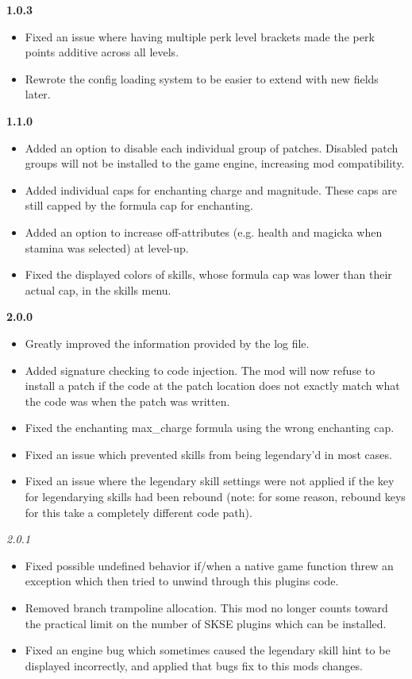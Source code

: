 \documentclass[12pt]{amsart}
\begin{document}
\startblock
\noindent
\textbf{1.0.3}
\begin{itemize}
    \item Fixed an issue where having multiple perk level brackets made the perk
          points additive across all levels.
    \item Rewrote the config loading system to be easier to extend with new
          fields later.
\end{itemize}
\stopblock

\startblock
\noindent
\textbf{1.1.0}
\begin{itemize}
    \item Added an option to disable each individual group of patches. Disabled
          patch groups will not be installed to the game engine, increasing mod
          compatibility.
    \item Added individual caps for enchanting charge and magnitude. These caps
          are still capped by the formula cap for enchanting.
    \item Added an option to increase off-attributes (e.g. health and magicka
          when stamina was selected) at level-up.
    \item Fixed the displayed colors of skills, whose formula cap was lower than
          their actual cap, in the skills menu.
\end{itemize}
\stopblock

\startblock
\noindent
\textbf{2.0.0}
\begin{itemize}
    \item Greatly improved the information provided by the log file.
    \item Added signature checking to code injection. The mod will now refuse to
          install a patch if the code at the patch location does not exactly
          match what the code was when the patch was written.
    \item Fixed the enchanting max\_charge formula using the wrong enchanting
          cap.
    \item Fixed an issue which prevented skills from being legendary'd in most
          cases.
    \item Fixed an issue where the legendary skill settings were not applied if
          the key for legendarying skills had been rebound (note: for some
          reason, rebound keys for this take a completely different code path).
\end{itemize}
\stopblock

\startblock
\noindent
\emph{2.0.1}
\begin{itemize}
    \item Fixed possible undefined behavior if/when a native game function threw
          an exception which then tried to unwind through this plugins code.
    \item Removed branch trampoline allocation. This mod no longer counts toward
          the practical limit on the number of SKSE plugins which can be
          installed.
    \item Fixed an engine bug which sometimes caused the legendary skill hint to
          be displayed incorrectly, and applied that bugs fix to this mods
          changes.
\end{itemize}
\stopblock
\end{document}
